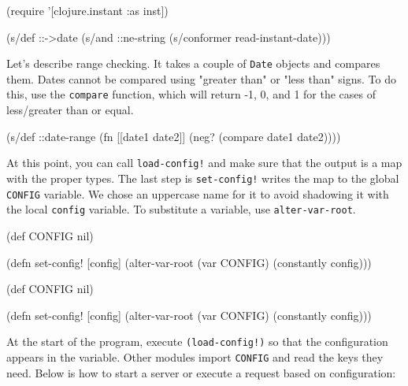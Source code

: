 \else

\begin{clojure}
(require '[clojure.instant :as inst])

(s/def ::->date
  (s/and ::ne-string (s/conformer read-instant-date)))
\end{clojure}

\fi


Let's describe range checking. It takes a couple of \verb|Date| objects and compares them. Dates cannot be compared using "greater than" or "less than" signs. To do this, use the \verb|compare| function, which will return -1, 0, and 1 for the cases of less/greater than or equal.

\begin{clojure}
(s/def ::date-range
  (fn [[date1 date2]]
    (neg? (compare date1 date2))))
\end{clojure}

At this point, you can call \verb|load-config!| and make sure that the output is
a map with the proper types. The last step is \verb|set-config!| writes the map
to the global \verb|CONFIG| variable. We chose an uppercase name for it to avoid
shadowing it with the local \verb|config| variable. To substitute a variable,
use \verb|alter-var-root|.


\ifx\DEVICETYPE\MOBILE

\begin{clojure}
(def CONFIG nil)

(defn set-config!
  [config]
  (alter-var-root (var CONFIG)
    (constantly config)))
\end{clojure}

\else

\begin{clojure}
(def CONFIG nil)

(defn set-config!
  [config]
  (alter-var-root (var CONFIG) (constantly config)))
\end{clojure}

\fi

At the start of the program, execute \texttt{(load-config!)} so that the configuration appears in the variable. Other modules import \verb|CONFIG| and read the keys they need. Below is how to start a server or execute a request based on configuration:


\ifx\DEVICETYPE\MOBILE

